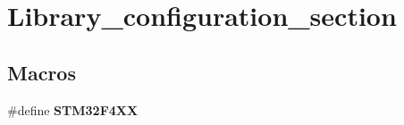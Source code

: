 \hypertarget{group___library__configuration__section}{}\section{Library\+\_\+configuration\+\_\+section}
\label{group___library__configuration__section}
\subsection*{Macros}
\begin{DoxyCompactItemize}
\item 
\#define {\bfseries S\+T\+M32\+F4\+XX}\hypertarget{group___library__configuration__section_ga252742cf70ce5210bc8817d386abced6}{}\label{group___library__configuration__section_ga252742cf70ce5210bc8817d386abced6}


\end{DoxyCompactItemize}

